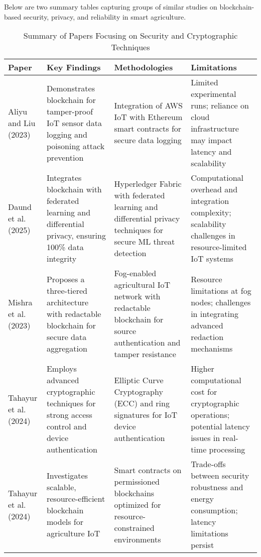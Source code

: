 \documentclass[12pt,onecolumn]{IEEEtran} %
\newcommand{\fitToPage}[1]{\begin{adjustbox}{max width=\textwidth}#1\end{adjustbox}}
\renewcommand{\arraystretch}{1.2} %
\begin{document}
Below are two summary tables capturing groups of similar studies on blockchain-based security, privacy, and reliability in smart agriculture.
\begin{table}[H]
\caption{Summary of Papers Focusing on Security and Cryptographic Techniques}
\label{tab:security}
\centering
\fitToPage{
\begingroup
\setlength{\tabcolsep}{4pt}
\renewcommand{\arraystretch}{1.15}
\footnotesize
\begin{tabularx}{\textwidth}{@{}P{0.18\textwidth}YYY@{}}
\toprule
\textbf{Paper} & \textbf{Key Findings} & \textbf{Methodologies} & \textbf{Limitations} \\
\midrule
Aliyu and Liu (2023) & Demonstrates blockchain for tamper-proof IoT sensor data logging and poisoning attack prevention & Integration of AWS IoT with Ethereum smart contracts for secure data logging & Limited experimental runs; reliance on cloud infrastructure may impact latency and scalability \\
\addlinespace
Daund et al. (2025) & Integrates blockchain with federated learning and differential privacy, ensuring 100\% data integrity & Hyperledger Fabric with federated learning and differential privacy techniques for secure ML threat detection & Computational overhead and integration complexity; scalability challenges in resource-limited IoT systems \\
\addlinespace
Mishra et al. (2023) & Proposes a three-tiered architecture with redactable blockchain for secure data aggregation & Fog-enabled agricultural IoT network with redactable blockchain for source authentication and tamper resistance & Resource limitations at fog nodes; challenges in integrating advanced redaction mechanisms \\
\addlinespace
Tahayur et al. (2024) & Employs advanced cryptographic techniques for strong access control and device authentication & Elliptic Curve Cryptography (ECC) and ring signatures for IoT device authentication & Higher computational cost for cryptographic operations; potential latency issues in real-time processing \\
\addlinespace
Tahayur et al. (2024) & Investigates scalable, resource-efficient blockchain models for agriculture IoT & Smart contracts on permissioned blockchains optimized for resource-constrained environments & Trade-offs between security robustness and energy consumption; latency limitations persist \\
\bottomrule
\end{tabularx}
\endgroup
}
\end{table}
\end{document}
